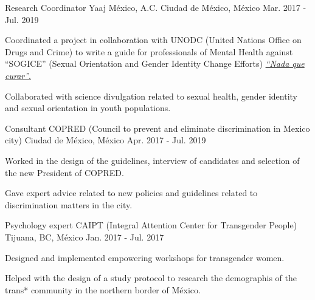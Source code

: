 \vspace{-3.2mm}
\begin{cventries}
    \cventry
        {Research Coordinator}
        {Yaaj México, A.C.}
        {Ciudad de México, México}
        {Mar. 2017 - Jul. 2019}
        {
            \begin{cvitems}
            \item {Coordinated a project in collaboration with UNODC (United Nations Office on Drugs and Crime) to write a guide for professionals of Mental Health against ``SOGICE'' (Sexual Orientation and Gender Identity Change Efforts) \href{https://www.unodc.org/documents/mexicoandcentralamerica/2019/GUIAECOSIGFINAL-compressed.pdf}{\textit{``Nada que curar''}.}}
                \item {Collaborated with science divulgation related to sexual health, gender identity and sexual orientation in youth populations.}
            \end{cvitems}
        }
    \cventry
        {Consultant}
        {COPRED (Council to prevent and eliminate discrimination in Mexico city)}
        {Ciudad de México, México}
        {Apr. 2017 - Jul. 2019}
        {
            \begin{cvitems}
                \item {Worked in the design of the guidelines, interview of candidates and selection of the new President of COPRED.}
                \item {Gave expert advice related to new policies and guidelines related to discrimination matters in the city.}
            \end{cvitems}
        }
    \cventry
        {Psychology expert}
        {CAIPT (Integral Attention Center for Transgender People)}
        {Tijuana, BC, México}
        {Jan. 2017 - Jul. 2017}
        {
            \begin{cvitems}
                \item {Designed and implemented empowering workshops for transgender women.}
                \item {Helped with the design of a study protocol to research the demographis of the trans* community in the northern border of México.}
            \end{cvitems}
        }
\end{cventries}
\vspace{-3.2mm}
